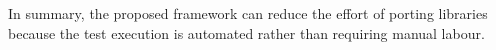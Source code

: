 \begin{comment}
\begin{table*}[h]
\centering
\begin{tabular}{|l|l|l|l|}
\hline
\textbf{Issue} & \textbf{EAE} & \textbf{4Diac} & \textbf{IEC 61499 Standard} \\ \hline
Direct addition of the \texttt{E\_DELAY} FB is not possible. (Migrating composite FBs with Standard FBs is complex.) & & & \\ \hline
The adapter cannot be found due to the required namespace selection as "Main." & & & \\ \hline
Repeated algorithm definitions and \texttt{end\_algorithm} statements. & & & \\ \hline
Case sensitivity issues in algorithms, e.g., "false" should be "FALSE" and "true" should be "TRUE." & & & \\ \hline
Algorithm names containing double underscores present problems. & & & \\ \hline
The use of "Main::" is not permitted. The namespace should be specified as "Main." & & & \\ \hline
Adapter connection issues require removal and redrawing of connections. & & & \\ \hline
Issues with semantic execution. & & & \\ \hline
Algorithm names containing double underscores present problems, so I changed the names. & & & \\ \hline
\texttt{timeout=false} is written in algorithms. & & & \\ \hline
\end{tabular}
\caption{Migration challenges encountered when transferring Function Blocks (FBs) from 4diac to EAE}
\end{table*}

\subsubsection{other findings}
Did we find any bugs?
Effort reduction?
Problems with different runtimes?
Problems with migration (execution semantics, XML specification)


\end{comment}

In summary, the proposed framework can reduce the effort of porting libraries because the test execution is automated rather than requiring manual labour. 

